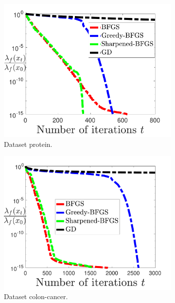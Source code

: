 \documentclass[11pt]{article}
\numberwithin{assumption}{section}
\numberwithin{remark}{section}
\numberwithin{theorem}{section}
\begin{document}
\begin{figure}
\begin{subfigure}{0.32\textwidth}
    \includegraphics[width=\textwidth]{Figures/protein.pdf}
    \caption{Dataset protein.}
\end{subfigure}
\hfill
\begin{subfigure}{0.32\textwidth}
    \includegraphics[width=\textwidth]{Figures/colon.pdf}
    \caption{Dataset colon-cancer.}
\end{subfigure}
\hfill
\begin{subfigure}{0.32\textwidth}

\end{subfigure}
\end{figure}
\end{document}
